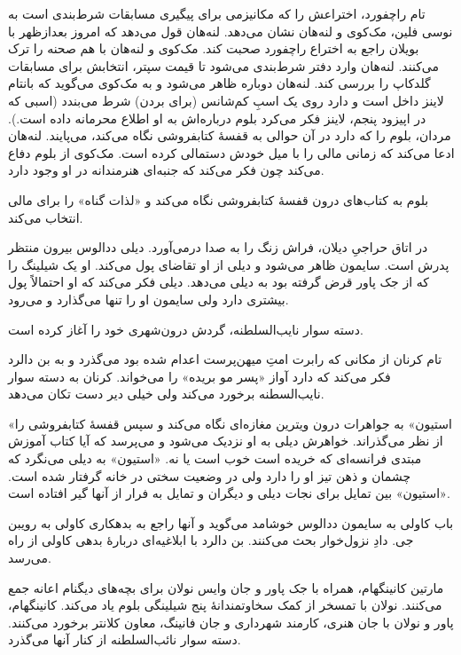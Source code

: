 \documentclass[12pt]{book}
\newcommand{\noun}[1]{«{#1}»}
\begin{document}
    تام راچفورد، اختراعش را که مکانیزمی برای پیگیری مسابقات شرط‌بندی است به نوسی فلین، مک‌کوی و لنه‌هان نشان می‌دهد. لنه‌هان قول می‌دهد که امروز بعدازظهر با بویلان راجع به اختراع راچفورد صحبت کند. مک‌کوی و لنه‌هان با هم صحنه را ترک می‌کنند. لنه‌هان وارد دفتر شرط‌بندی می‌شود تا قیمت سپتر، انتخابش برای مسابقات گلدکاپ را بررسی کند. لنه‌هان دوباره ظاهر می‌شود و به مک‌کوی می‌گوید که بانتام لاینز داخل است و دارد روی یک اسبِ کم‌شانس (برای بردن) شرط می‌بندد (اسبی که در اپیزود پنجم، لاینز فکر می‌کرد بلوم درباره‌اش به او اطلاع محرمانه داده است.). مردان، بلوم را که دارد در آن حوالی به قفسۀ کتابفروشی نگاه می‌کند، می‌پایند. لنه‌هان ادعا می‌کند که زمانی مالی را با میل خودش دستمالی کرده است. مک‌کوی از بلوم دفاع می‌کند چون فکر می‌کند که جنبه‌ای هنرمندانه در او وجود دارد.

    بلوم به کتاب‌های درون قفسۀ کتابفروشی نگاه می‌کند و «لذات گناه» را برای مالی انتخاب می‌کند.

    در اتاق حراجیِ دیلان، فراش زنگ را به صدا درمی‌آورد. دیلی ددالوس بیرون منتظر پدرش است. سایمون ظاهر می‌شود و دیلی از او تقاضای پول می‌کند. او یک شیلینگ را که از جک پاور قرض گرفته بود به دیلی می‌دهد. دیلی فکر می‌کند که او احتمالاً پول بیشتری دارد ولی سایمون او را تنها می‌گذارد و می‌رود.

    دسته سوار نایب‌السلطنه، گردش درون‌شهری خود را آغاز کرده است.

    تام کرنان از مکانی که رابرت امتِ میهن‌پرست اعدام شده بود می‌گذرد و به بن دالرد فکر می‌کند که دارد آواز «پسر مو بریده» را می‌خواند. کرنان به دسته سوار نایب‌السطنه برخورد می‌کند ولی خیلی دیر دست تکان می‌دهد.

    \noun{استیون} به جواهرات درون ویترین مغازه‌ای نگاه می‌کند و سپس قفسۀ کتابفروشی را از نظر می‌گذراند. خواهرش دیلی به او نزدیک می‌شود و می‌پرسد که آیا کتاب آموزش مبتدی فرانسه‌ای که خریده است خوب است یا نه. \noun{استیون} به دیلی می‌نگرد که چشمان و ذهن تیز او را دارد ولی در وضعیت سختی در خانه گرفتار شده است. \noun{استیون} بین تمایل برای نجات دیلی و دیگران و تمایل به فرار از آنها گیر افتاده است.

    باب کاولی به سایمون ددالوس خوشامد می‌گوید و آنها راجع به بدهکاری کاولی به رویبن جی. دادِ نزول‌خوار بحث می‌کنند. بن دالرد با ابلاغیه‌ای دربارۀ بدهی کاولی از راه می‌رسد.

    مارتین کانینگهام، همراه با جک پاور و جان وایس نولان برای بچه‌های دیگنام اعانه جمع می‌کنند. نولان با تمسخر از کمک سخاوتمندانۀ پنج شیلینگی بلوم یاد می‌کند. کانینگهام، پاور و نولان با جان هنری، کارمند شهرداری و جان فانینگ، معاون کلانتر برخورد می‌کنند. دسته سوار نائب‌السلطنه از کنار آنها می‌گذرد.
\end{document}
